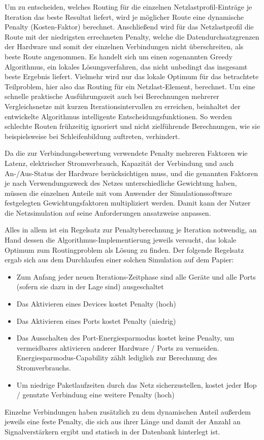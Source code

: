 Um zu entscheiden, welches Routing für die einzelnen Netzlastprofil-Einträge je Iteration das beste Resultat liefert, wird je möglicher Route eine dynamische Penalty (Kosten-Faktor) berechnet. Anschließend wird für das Netzlastprofil die Route mit der niedrigsten errechneten Penalty, welche die Datendurchsatzgrenzen der Hardware und somit der einzelnen Verbindungen nicht überschreiten, als beste Route angenommen. Es handelt sich um einen sogenannten Greedy Algorithmus, ein lokales Lösungsverfahren, das nicht unbedingt das insgesamt beste Ergebnis liefert. Vielmehr wird nur das lokale Optimum für das betrachtete Teilproblem, hier also das Routing für ein Netzlast-Element, berechnet. Um eine schnelle praktische Ausführungszeit auch bei Berechnungen mehrerer Vergleichsnetze mit kurzen Iterationsintervallen zu erreichen, beinhaltet der entwickelte Algorithmus intelligente Entscheidungsfunktionen.  So werden schlechte Routen frühzeitig ignoriert und nicht zielführende Berechnungen, wie sie beispielsweise bei Schleifenbildung auftreten, verhindert.

Da die zur Verbindungsbewertung verwendete Penalty mehreren Faktoren wie Latenz, elektrischer Stromverbrauch, Kapazität der Verbindung und auch An-/Aus-Status der Hardware berücksichtigen muss, und die genannten Faktoren je nach Verwendungszweck des Netzes unterschiedliche Gewichtung haben, müssen die einzelnen Anteile mit vom Anwender der Simulationssoftware festgelegten Gewichtungsfaktoren multipliziert werden. Damit kann der Nutzer die Netzsimulation auf seine Anforderungen ansatzweise anpassen.


Alles in allem ist ein Regelsatz zur Penaltyberechnung je Iteration notwendig, an Hand dessen die Algorithmus-Implementierung jeweils versucht, das lokale Optimum zum Routingproblem als Lösung zu finden.
Der folgende Regelsatz ergab sich aus dem Durchlaufen einer solchen Simulation auf dem Papier:
\begin{itemize}
	\item Zum Anfang jeder neuen Iterations-Zeitphase sind alle Geräte und alle Ports (sofern sie dazu in der Lage sind) ausgeschaltet
	\item Das Aktivieren eines Devices kostet Penalty (hoch)
	\item Das Aktivieren eines Ports kostet Penalty (niedrig)
	\item Das Ausschalten des Port-Energiesparmodus kostet keine Penalty, um vermeidbares aktivieren anderer Hardware / Ports zu vermeiden. Energiesparmodus-Capability zählt lediglich zur Berechnung des Stromverbrauchs.
	\item Um niedrige Paketlaufzeiten durch das Netz sicherzustellen, kostet jeder Hop / genutzte Verbindung eine weitere Penalty (hoch)
\end{itemize}
Einzelne Verbindungen haben zusätzlich zu dem dynamischen Anteil außerdem jeweils eine feste Penalty, die sich aus  ihrer Länge und damit der Anzahl an Signalverstärkern ergibt und statisch in der Datenbank hinterlegt ist.



